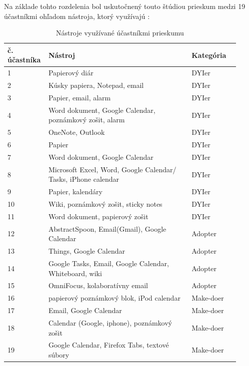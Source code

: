 \documentclass[10pt,slovak,a4paper]{article}
\begin{document}
		Na základe tohto rozdelenia bol uskutočnený touto štúdiou prieskum medzi 19 účastníkmi ohľadom nástroja, ktorý využívajú \cite{Haraty}:
		
		\par
		\begin{table}[tbh]
			
			\begin{center}
				\begin{tabular}{ | p{0.12\linewidth} | p{0.60\linewidth} | p{0.20\linewidth} | }
					\hline
						\textbf{č. účastníka} & \textbf{Nástroj} & \textbf{Kategória} \\ \hline
						1 & Papierový diár & DYIer \\ \hline
						2 & Kúsky papiera, Notepad, email & DYIer \\ \hline
						3 & Papier, email, alarm & DYIer \\ \hline
						4 & Word dokument, Google Calendar, poznámkový zošit, alarm & DYIer \\ \hline
						5 & OneNote, Outlook & DYIer \\ \hline
						6 & Papier & DYIer \\ \hline
						7 & Word dokument, Google Calendar & DYIer \\ \hline
						8 & Microsoft Excel, Word, Google Calendar/ Tasks, iPhone calendar & DYIer \\ \hline
						9 & Papier, kalendáry & DYIer \\ \hline
						10 & Wiki, poznámkový zošit, sticky notes & DYIer \\ \hline
						11 & Word dokument, papierový zošit & DYIer \\ \hline
						12 & AbstractSpoon, Email(Gmail), Google Calendar & Adopter \\ \hline
						13 & Things, Google Calendar & Adopter \\ \hline
						14 & Google Tasks, Email, Google Calendar, Whiteboard, wiki & Adopter \\ \hline
						15 & OmniFocus, kolaboratívny email & Adopter \\ \hline
						16 & papierový poznámkový blok, iPod calendar & Make-doer \\ \hline
						17 & Email, Google Calendar & Make-doer \\ \hline
						18 & Calendar (Google, iphone), poznámkový zošit & Make-doer \\ \hline
						19 & Google Calendar, Firefox Tabs, textové súbory & Make-doer \\ \hline
				\end{tabular}
				\caption{Nástroje využívané účastníkmi prieskumu \cite{Haraty}}
			\end{center}
		\end{table}
		
\end{document}
